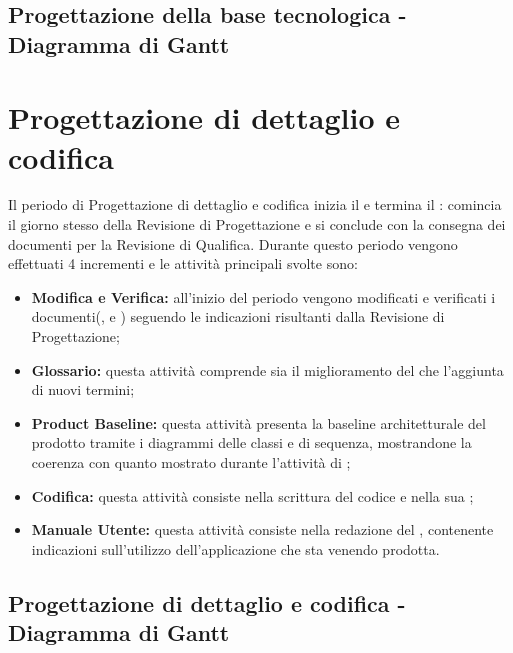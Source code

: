 \documentclass[PianoDiProgetto.tex]{subfiles}
\begin{document}
\begin{landscape}
	\subsection{Progettazione della base tecnologica - Diagramma di Gantt}
\end{landscape}


\section{Progettazione di dettaglio e codifica}
Il periodo di Progettazione di dettaglio e codifica inizia il  e termina il : comincia il giorno stesso della Revisione di Progettazione e si conclude con la consegna dei documenti per la Revisione di Qualifica. Durante questo periodo vengono effettuati 4 incrementi e le attività principali svolte sono:
\begin{itemize}
	\item \textbf{Modifica e Verifica:} all'inizio del periodo vengono modificati e verificati i documenti(\ndp, \pdp e \pdq) seguendo le indicazioni risultanti dalla Revisione di Progettazione;
	\item \textbf{Glossario:} questa attività comprende sia il miglioramento del \g che l'aggiunta di nuovi termini;
	\item \textbf{Product Baseline:} questa attività presenta la baseline architetturale del prodotto tramite i diagrammi delle classi e di sequenza, mostrandone la coerenza con quanto mostrato durante l'attività di \tb;
	\item \textbf{Codifica:} questa attività consiste nella scrittura del codice e nella sua ;
	\item \textbf{Manuale Utente:} questa attività consiste nella redazione del \mut, contenente indicazioni sull'utilizzo dell'applicazione che sta venendo prodotta.

\end{itemize}
\begin{landscape}
		\subsection{Progettazione di dettaglio e codifica - Diagramma di Gantt}
\end{landscape}
\end{document}
